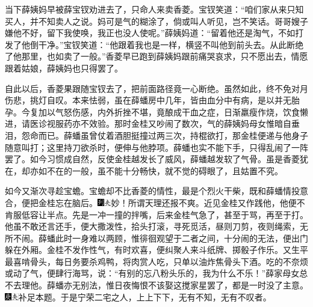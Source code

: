 当下薛姨妈早被薛宝钗劝进去了，只命人来卖香菱。宝钗笑道：``咱们家从来只知买人，并不知卖人之说。妈可是气的糊涂了，倘或叫人听见，岂不笑话。哥哥嫂子嫌他不好，留下我使唤，我正也没人使呢。''薛姨妈道：``留着他还是淘气，不如打发了他倒干净。''宝钗笑道：``他跟着我也是一样，横竖不叫他到前头去。从此断绝了他那里，也如卖了一般。''香菱早已跑到薛姨妈跟前痛哭哀求，只不愿出去，情愿跟着姑娘，薛姨妈也只得罢了。

自此以后，香菱果跟随宝钗去了，把前面路径竟一心断绝。虽然如此，终不免对月伤悲，挑灯自叹。本来怯弱，虽在薛蟠房中几年，皆由血分中有病，是以并无胎孕。今复加以气怒伤感，内外折挫不堪，竟酿成干血之症，日渐羸瘦作烧，饮食懒进，请医诊视服药亦不效验。那时金桂又吵闹了数次，气的薛姨妈母女惟暗自垂泪，怨命而已。薛蟠虽曾仗着酒胆挺撞过两三次，持棍欲打，那金桂便递与他身子随意叫打；这里持刀欲杀时，便伸与他脖项。薛蟠也实不能下手，只得乱闹了一阵罢了。如今习惯成自然，反使金桂越发长了威风，薛蟠越发软了气骨。虽是香菱犹在，却亦如不在的一般，虽不能十分畅快，就不觉的碍眼了，且姑置不究。

如今又渐次寻趁宝蟾。宝蟾却不比香菱的情性，最是个烈火干柴，既和薛蟠情投意合，便把金桂忘在脑后。{\includegraphics[width=3mm]{../Images/00007}\includegraphics[width=3mm]{../Images/00012}\footnotesize \kaishu 妙！所谓天理还报不爽。}近见金桂又作践他，他便不肯服低容让半点。先是一冲一撞的拌嘴，后来金桂气急了，甚至于骂，再至于打。他虽不敢还言还手，便大撒泼性，拾头打滚，寻死觅活，昼则刀剪，夜则绳索，无所不闹。薛蟠此时一身难以两顾，惟徘徊观望于二者之间，十分闹的无法，便出门躲在外厢。金桂不发作性气，有时欢喜，便纠聚人来斗纸牌、掷骰子作乐。又生平最喜啃骨头，每日务要杀鸡鸭，将肉赏人吃，只单以油炸焦骨头下酒。吃的不奈烦或动了气，便肆行海骂，说：``有别的忘八粉头乐的，我为什么不乐！''薛家母女总不去理他。薛蟠亦无别法，惟日夜悔恨不该娶这搅家星罢了，都是一时没了主意。{\includegraphics[width=3mm]{../Images/00004}\includegraphics[width=3mm]{../Images/00012}\footnotesize \kaishu 补足本题。}于是宁荣二宅之人，上上下下，无有不知，无有不叹者。

